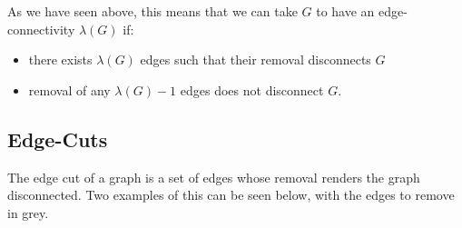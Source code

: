 As we have seen above, this means that we can take $G$ to have an edge-connectivity $\lambda (G)$ if:
\begin{itemize}
    \item there exists $\lambda (G)$ edges such that their removal disconnects $G$
    \item removal of any $\lambda (G) - 1$ edges does not disconnect $G$.
\end{itemize}

\subsection{Edge-Cuts}
The edge cut of a graph is a set of edges whose removal renders the graph disconnected. Two examples of this can be seen below, with the edges to remove in grey.

